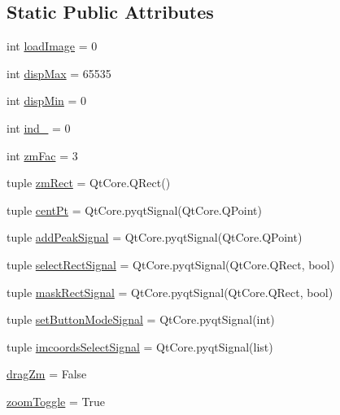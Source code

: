 \subsection*{Static Public Attributes}
\begin{DoxyCompactItemize}
\item 
int \hyperlink{classmy_im_display_1_1my_im_display_aeaa8491db62f6e99ba83f6fa81dc6d74}{load\-Image} = 0
\item 
int \hyperlink{classmy_im_display_1_1my_im_display_aaff409ee4de877ac2f0fcb090e1a5daf}{disp\-Max} = 65535
\item 
int \hyperlink{classmy_im_display_1_1my_im_display_a795083e40d9aa9b6e7d4a5d37910e187}{disp\-Min} = 0
\item 
int \hyperlink{classmy_im_display_1_1my_im_display_a4c5cc84a1c8d090c4c43d8f78b7b4d9f}{ind\-\_} = 0
\item 
int \hyperlink{classmy_im_display_1_1my_im_display_a34f600eea208832c0b785288ccad9fc7}{zm\-Fac} = 3
\item 
tuple \hyperlink{classmy_im_display_1_1my_im_display_a02f7742e2c4e540f6585f39c8af717cb}{zm\-Rect} = Qt\-Core.\-Q\-Rect()
\item 
tuple \hyperlink{classmy_im_display_1_1my_im_display_afe92f10aebabc4ab5d3f18a6fea84d75}{cent\-Pt} = Qt\-Core.\-pyqt\-Signal(Qt\-Core.\-Q\-Point)
\item 
tuple \hyperlink{classmy_im_display_1_1my_im_display_a52347d8a98f02a25ddc2929a08461909}{add\-Peak\-Signal} = Qt\-Core.\-pyqt\-Signal(Qt\-Core.\-Q\-Point)
\item 
tuple \hyperlink{classmy_im_display_1_1my_im_display_a9e0436ef995b6fa9769ab1cc004956e4}{select\-Rect\-Signal} = Qt\-Core.\-pyqt\-Signal(Qt\-Core.\-Q\-Rect, bool)
\item 
tuple \hyperlink{classmy_im_display_1_1my_im_display_aebd7f068977c74a612f0428fe26bf86c}{mask\-Rect\-Signal} = Qt\-Core.\-pyqt\-Signal(Qt\-Core.\-Q\-Rect, bool)
\item 
tuple \hyperlink{classmy_im_display_1_1my_im_display_a4c70f21c598d0b670373d09133d09767}{set\-Button\-Mode\-Signal} = Qt\-Core.\-pyqt\-Signal(int)
\item 
tuple \hyperlink{classmy_im_display_1_1my_im_display_a1f5a4286181533164cb3ab70ee622264}{imcoords\-Select\-Signal} = Qt\-Core.\-pyqt\-Signal(list)
\item 
\hyperlink{classmy_im_display_1_1my_im_display_aed334f8955978445c19ec065984ffdf1}{drag\-Zm} = False
\item 
\hyperlink{classmy_im_display_1_1my_im_display_a1ede5c771d24ccc9bc28d13b9af5aea9}{zoom\-Toggle} = True

\end{DoxyCompactItemize}
